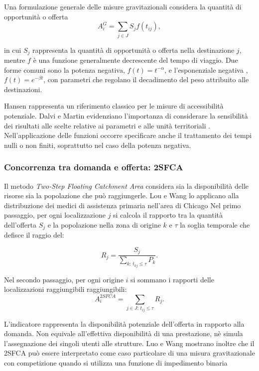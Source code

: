 Una formulazione generale delle misure gravitazionali considera la quantità di opportunità o offerta 
\begin{equation}
    A_i^{G}=\sum_{j\in J}S_j f(t_{ij}),
\end{equation}

in cui $S_j$ rappresenta la quantità di opportunità o offerta nella destinazione $j$, mentre $f$ è una funzione generalmente decrescente del tempo di viaggio. Due forme comuni sono la potenza negativa, $f(t) = t^{-\alpha}$, e l'esponenziale negativa , $f(t)=e^{-\beta t}$, con parametri che regolano il decadimento del peso attribuito alle destinazioni.

Hansen rappresenta un riferimento classico per le misure di accessibilità potenziale. Dalvi e Martin evidenziano l'importanza di considerare la sensibilità dei risultati alle scelte relative ai parametri e alle unità territoriali \cite{hansen1959,dalvi1976}. 
Nell'applicazione delle funzioni occorre specificare anche il trattamento dei tempi nulli o non finiti, soprattutto nel caso della potenza negativa.\cite{hansen1959,dalvi1976}

\subsubsection{Concorrenza tra domanda e offerta: 2SFCA}

Il metodo \textit{Two-Step Floating Catchment Area} considera sia la disponibilità delle risorse sia la popolazione che può raggiungerle. Lou e Wang lo applicano alla distribuzione dei medici di assistenza primaria nell'area di Chicago \cite{luo2003}
Nel primo passaggio, per ogni localizzazione $j$  si calcola il rapporto tra la quantità dell'offerta $S_j$ e la popolazione nella zona di origine $k$ e $\tau$ la soglia temporale che defisce il raggio del:

\begin{equation}
    R_j =\frac{S_j}{\displaystyle\sum_{k:\,t_{kj}\le\tau}P_k}.
\end{equation}

Nel secondo passaggio, per ogni origine $i$ si sommano i rapporti delle localizzazioni raggiungibili raggiungibili:
\begin{equation}
    A_i^{2SFCA}= \sum_{j\in J:\,t_{ij}\le\tau}R_j.
\end{equation}

L'indicatore rappresenta la disponibilità potenziale dell'offerta in rapporto alla domanda. Non equivale all'effettiva disponibilità di una prestazione, nè simula l'assegnazione dei singoli utenti alle strutture.
Luo e Wang mostrano inoltre che il 2SFCA può essere interpretato come caso particolare di una misura gravitazionale con competizione quando si utilizza una funzione di impedimento binaria \cite{luo2003}

